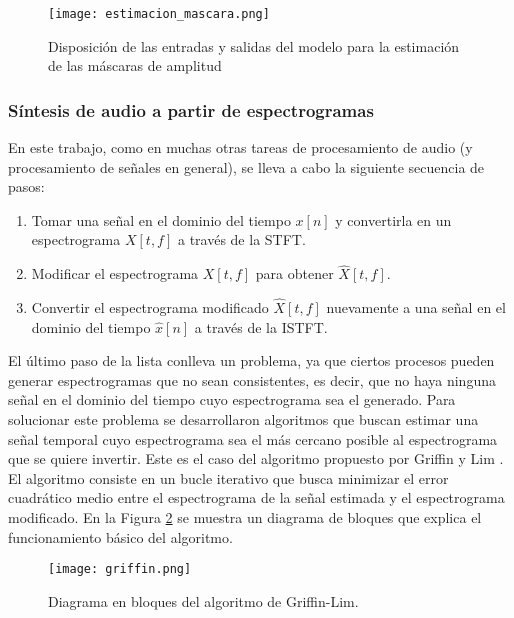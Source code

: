 \begin{figure}[H]
  \centering{}
  \texttt{[image: estimacion\_mascara.png]}
  \caption{Disposición de las entradas y salidas del modelo para la estimación de las máscaras de amplitud}
  \label{fig:red_estim}
\end{figure}
  


\subsubsection{Síntesis de audio a partir de espectrogramas}

En este trabajo, como en muchas otras tareas de procesamiento de audio (y procesamiento de señales en general), se lleva a cabo la siguiente secuencia de pasos:

\begin{enumerate}
\item Tomar una señal en el dominio del tiempo $x[n]$ y convertirla en un espectrograma $X[t,f]$ a través de la STFT.
\item Modificar el espectrograma $X[t,f]$ para obtener $\hat{X}[t,f]$. 
\item Convertir el espectrograma modificado $\hat{X}[t,f]$ nuevamente a una señal en el dominio del tiempo $\hat{x}[n]$ a través de la ISTFT.
\end{enumerate}

El último paso de la lista conlleva un problema, ya que ciertos procesos pueden generar espectrogramas que no sean consistentes, es decir, que no haya ninguna señal en el dominio del tiempo cuyo espectrograma sea el generado. Para solucionar este problema se desarrollaron algoritmos que buscan estimar una señal temporal cuyo espectrograma sea el más cercano posible al espectrograma que se quiere invertir. Este es el caso del algoritmo propuesto por Griffin y Lim \cite{griffinlim}. El algoritmo consiste en un bucle iterativo que busca minimizar el error cuadrático medio entre el espectrograma de la señal estimada y el espectrograma modificado. En la Figura \ref{fig:griffin} se muestra un diagrama de bloques que explica el funcionamiento básico del algoritmo. 

\begin{figure}[H]
  \centering{}
  \texttt{[image: griffin.png]}
  \caption{Diagrama en bloques del algoritmo de Griffin-Lim.}
  \label{fig:griffin}
\end{figure}

